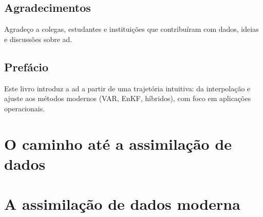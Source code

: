 \documentclass[12pt,a4paper,oneside]{book}
\begin{document}
\chapter*{Agradecimentos}
Agradeço a colegas, estudantes e instituições que contribuíram com dados, ideias e discussões sobre \gls{ad}.

\chapter*{Prefácio}
Este livro introduz a \gls{ad} a partir de uma trajetória intuitiva: da interpolação e ajuste aos métodos modernos (VAR, EnKF, híbridos), com foco em aplicações operacionais.

\tableofcontents

\mainmatter

\part{O caminho até a assimilação de dados}


\part{A assimilação de dados moderna}

\end{document}
